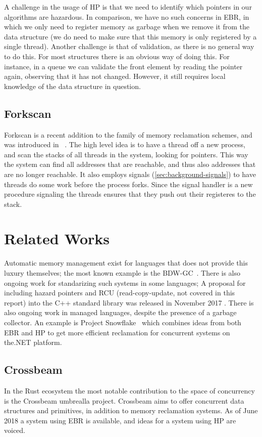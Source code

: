 A challenge in the usage of HP is that we need to identify which pointers in our algorithms are
hazardous. In comparison, we have no such concerns in EBR, in which we only need to register memory
as garbage when we remove it from the data structure (we do need to make sure that this memory is
only registered by a single thread). Another challenge is that of validation, as there is no
general way to do this. For most structures there is an obvious way of doing this. For instance, in
a queue we can validate the front element by reading the  pointer again, observing that
it has not changed. However, it still requires local knowledge of the data structure in question.


\subsection{Forkscan\label{sec:forkscan}}

Forkscan is a recent addition to the family of memory reclamation schemes, and was introduced in
~\cite{alistarh2017forkscan}. The high level idea is to have a thread  off a new
process, and scan the stacks of all threads in the system, looking for pointers. This way the
system can find all addresses that are reachable, and thus also addresses that are no longer
reachable. It also employs signals (\cref{sec:background-signals}) to have threads do some work
before the process forks. Since the signal handler is a new procedure signaling the threads ensures
that they push out their registeres to the stack.


\section{Related Works\label{sec:background-related}}

Automatic memory management exist for languages that does not provide this luxury themselves; the
most known example is the BDW-GC~\cite{bdwgc}.  There is also ongoing work for standarizing such
systems in some languages; A proposal for including hazard pointers and RCU (read-copy-update, not
covered in this report) into the C++ standard library was released in November 2017 \cite{cpp:mr}.
There is also ongoing work in managed languages, despite the presence of a garbage collector. An
example is Project
Snowflake~\cite{project-snowflake-non-blocking-safe-manual-memory-management-net} which combines
ideas from both EBR and HP to get more efficient reclamation for concurrent systems on the\@.NET
platform.


\subsection{Crossbeam}

In the Rust ecosystem the most notable contribution to the space of concurrency is the Crossbeam
umbrealla project\cite{crossbeam}. Crossbeam aims to offer concurrent data structures and
primitives, in addition to memory reclamation systems. As of June 2018 a system using EBR is
available, and ideas for a system using HP are voiced.

